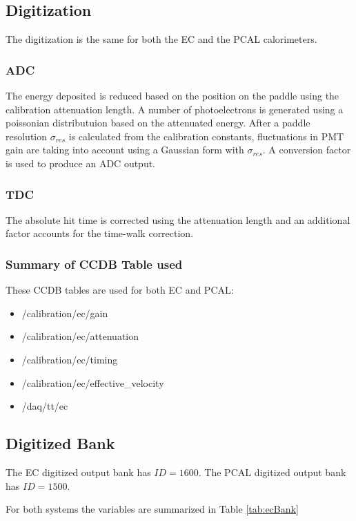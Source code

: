 \subsection{Digitization}
The digitization is the same for both the EC and the PCAL calorimeters.

\subsubsection{ADC}

The energy deposited is reduced based on the position on the paddle using the calibration attenuation length.
A number of photoelectrons is generated using a poissonian distributuion based on the attenuated energy.
After a paddle resolution $\sigma_{res}$ is calculated from the calibration constants, fluctuations in PMT gain
are taking into account using a Gaussian form with $\sigma_{res}$. A conversion factor is used to produce an ADC output.

\subsubsection{TDC}
The absolute hit time is corrected using the attenuation length and an additional factor accounts for the time-walk correction.

\subsubsection{Summary of CCDB Table used}

These CCDB tables are used for both EC and PCAL:

\begin{itemize}
	\item /calibration/ec/gain
	\item /calibration/ec/attenuation
	\item /calibration/ec/timing
	\item /calibration/ec/effective\_velocity
	\item /daq/tt/ec
\end{itemize}

\subsection{Digitized Bank}
The EC digitized output bank has $ID=1600$.
The PCAL digitized output bank has $ID=1500$.

For both systems the variables are summarized in Table \ref{tab:ecBank}

